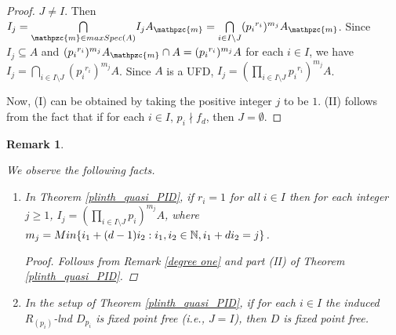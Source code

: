 \documentclass[a4paper,12pt]{article}
\newtheorem{cor}[thm]{Corollary}
\newtheorem{rem}[thm]{Remark}
\newcommand{\m}{\mathpzc{m}}
\newcommand{\bN}{\mathbb N}
\begin{document}
{\begin{proof}
 $J\neq I$. Then $I_j={\underset{\m\in {\rm maxSpec}(A)}\bigcap} I_jA_\m= {\underset{i\in I\setminus J}\bigcap} ({p_i}^{r_i})^{m_j}A_\m$.
Since $I_j\subseteq A$ and $({p_i}^{r_i})^{m_j}A_\m\cap A=({p_i}^{r_i})^{m_j}A$ for each $i\in I$, we have $I_j={\underset{i\in I\setminus J}\bigcap}({p_i}^{r_i})^{m_j}A$. Since $A$ is a UFD, $I_j=({\underset{i\in I\setminus J}\prod}{p_i}^{r_i})^{m_j}A$.

\medskip\noindent
Now, (I) can be obtained by taking the positive integer $j$ to be $1$. (II) follows from the fact that if for each $i\in I$, $p_i\nmid f_d$, then $J=\emptyset$.
\end{proof}


\begin{rem} \em{We observe the following facts.
	
	\begin{enumerate}
		\item In Theorem \ref{plinth_quasi_PID},	if $r_i=1$ for all $i\in I$ then for each integer $j\geqslant 1$, $I_j=({\underset{i\in I\setminus J}\prod}{p_i})^{m_j}A$, where $m_j={\rm Min}\{i_1+(d-1)i_2:i_1,i_2\in\bN,i_1+di_2=j\}$.
		
		\begin{proof}
			Follows from Remark \ref{degree one} and part (II) of Theorem \ref{plinth_quasi_PID}.
		\end{proof}
		
		\item In the setup of Theorem \ref{plinth_quasi_PID}, if  for each $i\in I$ the induced $R_{(p_i)}$-lnd $D_{p_i}$ is fixed point free (i.e., $J=I$), then $D$ is fixed point free.
	\end{enumerate}}

\end{rem}




%	
%
%

}
\end{document}
